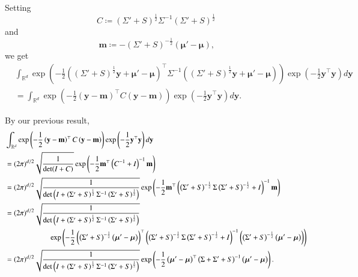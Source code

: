 \documentclass[oneside, 11pt]{article}
\begin{document}
    Setting \[
        C \coloneqq \left(\Sigma' + S\right)^{\frac12} \Sigma^{-1} \left(\Sigma' + S\right)^{\frac12}
    \] and \[
        \mathbf{m} \coloneqq -\left(\Sigma' + S\right)^{-\frac12} (\bm{\mu}' - \bm{\mu}) \text{,}
    \] we get \begin{align*}
        &\int_{\mathbb{R}^d} \exp\left(-\frac12 \left(\left(\Sigma' + S\right)^{\frac12}\mathbf{y} + \bm{\mu}'-\bm{\mu}\right)^\top \Sigma^{-1} \left(\left(\Sigma' + S\right)^{\frac12}\mathbf{y} + \bm{\mu}'-\bm{\mu}\right) \right) \exp\left(-\frac{1}{2}\mathbf{y}^\top\mathbf{y}\right) d\mathbf{y} \\
        &= \int_{\mathbb{R}^d} \exp\left(-\frac12 \left(\mathbf{y} - \mathbf{m}\right)^\top C \left(\mathbf{y} - \mathbf{m}\right) \right) \exp\left(-\frac{1}{2}\mathbf{y}^\top\mathbf{y}\right) d\mathbf{y} \text{.}
    \end{align*}

    By our previous result, \begin{align*}
        &\int_{\mathbb{R}^d} \exp\left(-\frac12 \left(\mathbf{y} - \mathbf{m}\right)^\top C \left(\mathbf{y} - \mathbf{m}\right) \right) \exp\left(-\frac{1}{2}\mathbf{y}^\top\mathbf{y}\right) d\mathbf{y} \\
        &= (2 \pi)^{d/2} \sqrt{\frac{1}{\det(I + C)}} \exp\left(-\frac{1}{2}\mathbf{m}^\top \left(C^{-1} + I\right)^{-1}\mathbf{m}\right) \\
        &= (2 \pi)^{d/2} \sqrt{\frac{1}{\det\left(I + \left(\Sigma' + S\right)^{\frac12} \Sigma^{-1} \left(\Sigma' + S\right)^{\frac12}\right)}} \exp\left(-\frac{1}{2}\mathbf{m}^\top \left(\left(\Sigma' + S\right)^{-\frac12} \Sigma \left(\Sigma' + S\right)^{-\frac12} + I\right)^{-1}\mathbf{m}\right) \\
        &= (2 \pi)^{d/2} \sqrt{\frac{1}{\det\left(I + \left(\Sigma' + S\right)^{\frac12} \Sigma^{-1} \left(\Sigma' + S\right)^{\frac12}\right)}} \\
        &\hspace{60pt}\exp\left(-\frac{1}{2}\left(\left(\Sigma' + S\right)^{-\frac12} \left(\bm{\mu}' - \bm{\mu}\right)\right)^\top \left(\left(\Sigma' + S\right)^{-\frac12} \Sigma \left(\Sigma' + S\right)^{-\frac12} + I\right)^{-1}\left(\left(\Sigma' + S\right)^{-\frac12} \left(\bm{\mu}' - \bm{\mu}\right)\right)\right) \\
        &= (2 \pi)^{d/2} \sqrt{\frac{1}{\det\left(I + \left(\Sigma' + S\right)^{\frac12} \Sigma^{-1} \left(\Sigma' + S\right)^{\frac12}\right)}} \exp\left(-\frac{1}{2}\left(\bm{\mu}' - \bm{\mu}\right)^\top \left( \Sigma + \Sigma' + S\right)^{-1}\left(\bm{\mu}' - \bm{\mu}\right)\right) \text.
    \end{align*}
\end{document}
